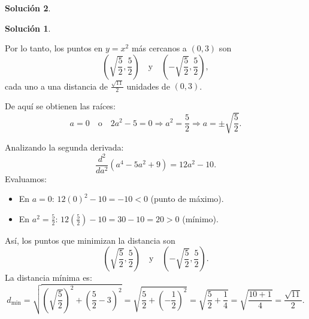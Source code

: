 \documentclass{article}
\theoremstyle{definition}
\newtheorem*{solution}{Solución}
\begin{document}
\begin{solution}
\begin{solution}
    \begin{center}
    \end{center}
    
    \medskip
    
    Por lo tanto, los puntos en \( y=x^2 \) más cercanos a \( (0,3) \) son 
    \[
    \left(\sqrt{\frac{5}{2}}, \frac{5}{2}\right) \quad \text{y} \quad \left(-\sqrt{\frac{5}{2}}, \frac{5}{2}\right),
    \]
    cada uno a una distancia de \( \frac{\sqrt{11}}{2} \) unidades de \( (0,3) \).
    
    \end{solution}
    
De aquí se obtienen las raíces:
\[
a=0 \quad \text{o} \quad 2a^2-5=0 \Longrightarrow a^2=\frac{5}{2} \Longrightarrow a=\pm\sqrt{\frac{5}{2}}.
\]

Analizando la segunda derivada:
\[
\frac{d^2}{da^2}\left(a^4-5a^2+9\right)=12a^2-10.
\]
Evaluamos:
\begin{itemize}
    \item En \( a=0 \): \( 12(0)^2-10=-10<0 \) (punto de máximo).
    \item En \( a^2=\frac{5}{2} \): \( 12\left(\frac{5}{2}\right)-10=30-10=20>0 \) (mínimo).
\end{itemize}

Así, los puntos que minimizan la distancia son
\[
\left(\sqrt{\frac{5}{2}}, \frac{5}{2}\right) \quad \text{y} \quad \left(-\sqrt{\frac{5}{2}}, \frac{5}{2}\right).
\]
La distancia mínima es:
\[
d_{\min} = \sqrt{\left(\sqrt{\frac{5}{2}}\right)^2+\left(\frac{5}{2}-3\right)^2} 
= \sqrt{\frac{5}{2}+\left(-\frac{1}{2}\right)^2} 
= \sqrt{\frac{5}{2}+\frac{1}{4}}
= \sqrt{\frac{10+1}{4}} = \frac{\sqrt{11}}{2}.
\]


\end{solution}
\end{document}

